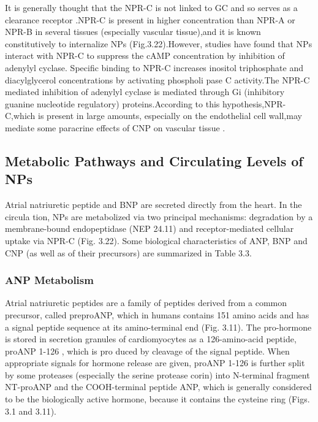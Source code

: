 \documentclass[14pt,a4paper,onecolumn]{extarticle}
\begin{document}
It is generally thought that the NPR-C is not linked to GC and so serves as a clearance receptor \citep{28} \citep{77} \citep{bib33}.NPR-C is present in higher concentration than NPR-A or NPR-B in several tissues (especially vascular tissue),and it is known constitutively to internalize NPs \citep{172} (Fig.3.22).However, studies have found that NPs interact with NPR-C to suppress the cAMP concentration by inhibition of adenylyl cyclase. Specific binding to NPR-C increases inositol triphosphate and diacylglycerol concentrations by activating phospholi pase C activity.The NPR-C mediated inhibition of adenylyl cyclase is mediated through Gi (inhibitory guanine nucleotide regulatory) proteins.According to this hypothesis,NPR-C,which is present in large amounts, especially on the endothelial cell wall,may mediate some paracrine effects of CNP on vascular tissue \citep{168} \citep{190}.



\subsection{Metabolic Pathways and Circulating Levels of NPs}

Atrial natriuretic peptide and BNP are secreted directly from the heart. In the circula tion, NPs are metabolized via two principal mechanisms: degradation by a membrane-bound endopeptidase (NEP 24.11) and receptor-mediated cellular uptake via NPR-C \citep{14} (Fig. 3.22). Some biological characteristics of ANP, BNP and CNP (as well as of their precursors) are summarized in Table 3.3.



\subsubsection{ANP Metabolism}

Atrial natriuretic peptides are a family of peptides derived from a common precursor, called preproANP, which in humans contains 151 amino acids and has a signal peptide sequence at its amino-terminal end (Fig. 3.11). The pro-hormone is stored in secretion granules of cardiomyocytes as a 126-amino-acid peptide, proANP 1-126 , which is pro duced by cleavage of the signal peptide. When appropriate signals for hormone release are given, proANP 1-126 is further split by some proteases (especially the serine protease corin) \citep{192} into N-terminal fragment NT-proANP and the COOH-terminal peptide ANP, which is generally considered to be the biologically active hormone, because it contains the cysteine ring (Figs. 3.1 and 3.11).
\end{document}
